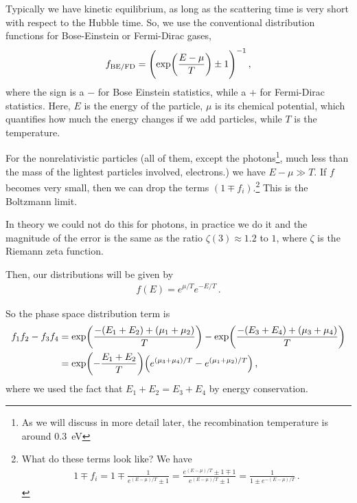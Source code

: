 \documentclass[main.tex]{subfiles}
\begin{document}

Typically we have kinetic equilibrium, as long as the scattering time is very short with respect to the Hubble time. 
So, we use the conventional distribution functions for Bose-Einstein or Fermi-Dirac gases,
%
\begin{align}
f_{\text{BE/FD}} = \qty(\exp(\frac{E- \mu }{T}) \pm 1)^{-1}
\,,
\end{align}
%
where the sign is a \(-\) for Bose Einstein statistics, while a \(+\) for Fermi-Dirac statistics. 
Here, \(E\) is the energy of the particle, \(\mu \) is its chemical potential, which quantifies how much the energy changes if we add particles, while \(T\) is the temperature. 

For the nonrelativistic particles (all of them, except the photons\footnote{As we will discuss in more detail later, the recombination temperature is around \SI{.3}{eV}}, much less than the mass of the lightest particles involved, electrons.) we have \(E - \mu \gg T\). 
If \(f\) becomes very small, then we can drop the terms \((1 \mp f_i)\).\footnote{What do these terms look like? We have 
%
\begin{align}
1 \mp f_i = 1 \mp \frac{1}{e^{(E-\mu ) / T} \pm 1}
= \frac{e^{(E - \mu ) / T} \pm 1 \mp 1}{e^{(E- \mu ) / T} \pm 1 }
= \frac{1}{1 \pm e^{- (E - \mu ) / T}}
\,.
\end{align}
%
} This is the Boltzmann limit. 

In theory we could not do this for photons, in practice we do it and the magnitude of the error is the same as the ratio \(\zeta (3) \approx 1.2\) to \(1\), where \(\zeta \) is the Riemann zeta function. 

Then, our distributions will be given by 
%
\begin{align}
f(E) = e^{ \mu / T} e^{- E/ T}
\,.
\end{align}

So the phase space distribution term is 
%
\begin{align}
f_1 f_2 - f_3 f_4 &= \exp(\frac{-(E_1 + E_2 ) + (\mu_1 +\mu_2 )}{T})
- \exp(\frac{-(E_3 + E_4) + (\mu_3 +\mu_4 )}{T})\\
&=\exp(- \frac{E_1 + E_2 }{T} ) \qty(e^{(\mu_3 + \mu_4 ) / T} - e^{(\mu_1 + \mu_2 ) / T})
\,,
\end{align}
%
where we used the fact that \(E_1 + E_2 = E_3 + E_4 \) by energy conservation. 
\end{document}

